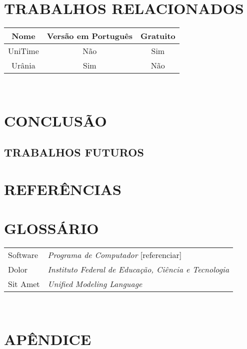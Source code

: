 \documentclass[12pt,a4paper]{article}
\begin{document}
			\lipsum[1]

	\newpage

	\section{TRABALHOS RELACIONADOS}

		\begin{tabular}{| c | c | c |}
		  \hline
		  Nome & Versão em Português & Gratuito\\
		  \hline\hline
		  UniTime & Não & Sim \\
		  \hline
		  Urânia & Sim & Não \\
		  \hline
		\end{tabular}\\


	\newpage


	\section{CONCLUSÃO}

	\lipsum[1]

		\subsection{TRABALHOS FUTUROS}

			\lipsum[1]

	\newpage


	\section*{REFERÊNCIAS}

	\printbibliography[heading=none]

	\newpage

	\section*{GLOSSÁRIO}

	\begin{tabular}{p{3cm} p{}}
	  Software & \textit{Programa de Computador} [referenciar] \\
	  Dolor & \textit{Instituto Federal de Educação, Ciência e Tecnologia} \\
	  Sit Amet & \textit{Unified Modeling Language} \\
	\end{tabular}\\


	\newpage

	\section*{APÊNDICE}

	\lipsum[1]

	\newpage
\end{document}
